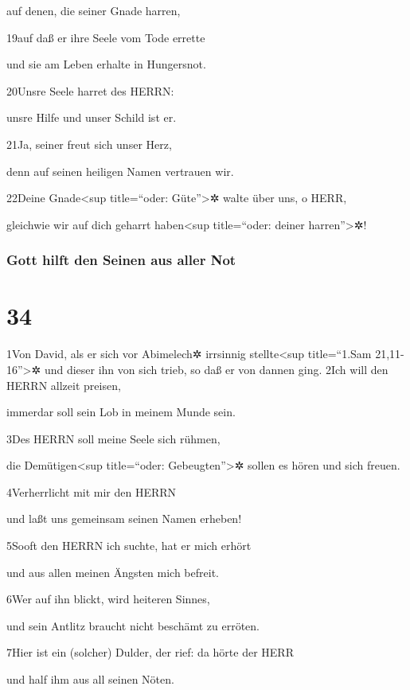 auf denen, die seiner Gnade harren,

19auf daß er ihre Seele vom Tode errette

und sie am Leben erhalte in Hungersnot.

20Unsre Seele harret des HERRN:

unsre Hilfe und unser Schild ist er.

21Ja, seiner freut sich unser Herz,

denn auf seinen heiligen Namen vertrauen wir.

22Deine Gnade\textless sup title=``oder: Güte''\textgreater✲ walte über
uns, o HERR,

gleichwie wir auf dich geharrt haben\textless sup title=``oder: deiner
harren''\textgreater✲!

\hypertarget{gott-hilft-den-seinen-aus-aller-not}{%
\subsubsection{Gott hilft den Seinen aus aller
Not}\label{gott-hilft-den-seinen-aus-aller-not}}

\hypertarget{section-33}{%
\section{34}\label{section-33}}

1Von David, als er sich vor Abimelech✲ irrsinnig stellte\textless sup
title=``1.Sam 21,11-16''\textgreater✲ und dieser ihn von sich trieb, so
daß er von dannen ging. 2Ich will den HERRN allzeit preisen,

immerdar soll sein Lob in meinem Munde sein.

3Des HERRN soll meine Seele sich rühmen,

die Demütigen\textless sup title=``oder: Gebeugten''\textgreater✲ sollen
es hören und sich freuen.

4Verherrlicht mit mir den HERRN

und laßt uns gemeinsam seinen Namen erheben!

5Sooft den HERRN ich suchte, hat er mich erhört

und aus allen meinen Ängsten mich befreit.

6Wer auf ihn blickt, wird heiteren Sinnes,

und sein Antlitz braucht nicht beschämt zu erröten.

7Hier ist ein (solcher) Dulder, der rief: da hörte der HERR

und half ihm aus all seinen Nöten.

